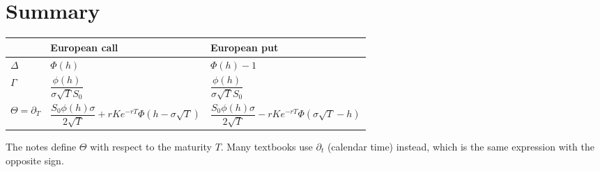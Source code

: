 \documentclass[11pt]{article}
\begin{document}
\section*{Summary}
\renewcommand{\arraystretch}{2.2}
\begin{tabular}{@{}l|l|l@{}}
 & European call & European put\\\hline
$\Delta$ & $\Phi(h)$ & $\Phi(h)-1$\\
$\Gamma$ & $\dfrac{\phi(h)}{\sigma\sqrt T S_0}$ & $\dfrac{\phi(h)}{\sigma\sqrt T S_0}$\\
$\Theta=\partial_T$ & $\dfrac{S_0\phi(h)\sigma}{2\sqrt T} + rKe^{-rT}\Phi(h-\sigma\sqrt T)$ & $\dfrac{S_0\phi(h)\sigma}{2\sqrt T} - rKe^{-rT}\Phi(\sigma\sqrt T-h)$\\
\end{tabular}

\medskip
\small The notes define $\Theta$ with respect to the maturity $T$. Many textbooks use $\partial_t$ (calendar time) instead, which is the same expression with the opposite sign.
\end{document}
